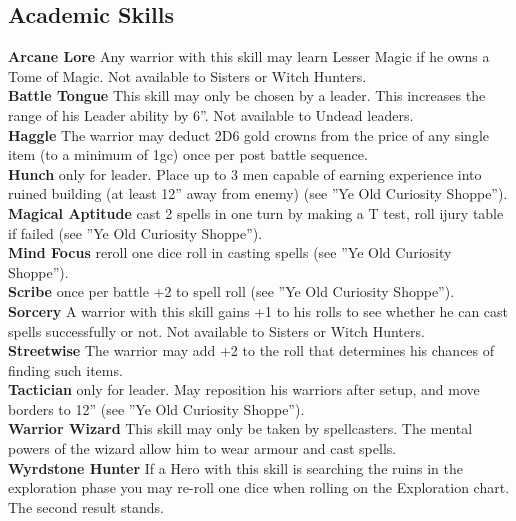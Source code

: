 \subsection*{Academic Skills}
\textbf{Arcane Lore} Any warrior with this skill may learn Lesser Magic if he owns a Tome of Magic. Not available to Sisters or Witch Hunters. \\
\textbf{Battle Tongue} This skill may only be chosen by a leader. This increases the range of his Leader ability by 6”. Not available to Undead leaders. \\
\textbf{Haggle} The warrior may deduct 2D6 gold crowns from the price of any single item (to a minimum of 1gc) once per post battle sequence. \\
\textbf{Hunch} only for leader. Place up to 3 men capable of earning experience into ruined building (at least 12” away from enemy) (see ”Ye Old Curiosity Shoppe”). \\
\textbf{Magical Aptitude} cast 2 spells in one turn by making a T test, roll ijury table if failed (see ”Ye Old Curiosity Shoppe”). \\
\textbf{Mind Focus} reroll one dice roll in casting spells (see ”Ye Old Curiosity Shoppe”). \\
\textbf{Scribe} once per battle +2 to spell roll (see ”Ye Old Curiosity Shoppe”). \\
\textbf{Sorcery} A warrior with this skill gains +1 to his rolls to see whether he can cast spells successfully or not. Not available to Sisters or Witch Hunters. \\
\textbf{Streetwise} The warrior may add +2 to the roll that determines his chances of finding such items. \\
\textbf{Tactician} only for leader. May reposition his warriors after setup, and move borders to 12” (see ”Ye Old Curiosity Shoppe”). \\
\textbf{Warrior Wizard} This skill may only be taken by spellcasters. The mental powers of the wizard allow him to wear armour and cast spells. \\
\textbf{Wyrdstone Hunter} If a Hero with this skill is searching the ruins in the exploration phase you may re-roll one dice when rolling on the Exploration chart. The second result stands.
